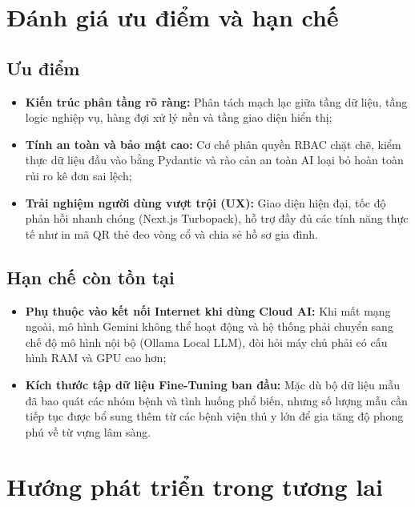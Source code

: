 \section{Đánh giá ưu điểm và hạn chế}
\label{sec:uunhuocdiem}

\subsection{Ưu điểm}
\begin{itemize}[leftmargin=1.5cm]
    \item \textbf{Kiến trúc phân tầng rõ ràng:} Phân tách mạch lạc giữa tầng dữ liệu, tầng logic nghiệp vụ, hàng đợi xử lý nền và tầng giao diện hiển thị;
    \item \textbf{Tính an toàn và bảo mật cao:} Cơ chế phân quyền RBAC chặt chẽ, kiểm thực dữ liệu đầu vào bằng Pydantic và rào cản an toàn AI loại bỏ hoàn toàn rủi ro kê đơn sai lệch;
    \item \textbf{Trải nghiệm người dùng vượt trội (UX):} Giao diện hiện đại, tốc độ phản hồi nhanh chóng (Next.js Turbopack), hỗ trợ đầy đủ các tính năng thực tế như in mã QR thẻ đeo vòng cổ và chia sẻ hồ sơ gia đình.
\end{itemize}

\subsection{Hạn chế còn tồn tại}
\begin{itemize}[leftmargin=1.5cm]
    \item \textbf{Phụ thuộc vào kết nối Internet khi dùng Cloud AI:} Khi mất mạng ngoài, mô hình Gemini không thể hoạt động và hệ thống phải chuyển sang chế độ mô hình nội bộ (Ollama Local LLM), đòi hỏi máy chủ phải có cấu hình RAM và GPU cao hơn;
    \item \textbf{Kích thước tập dữ liệu Fine-Tuning ban đầu:} Mặc dù bộ dữ liệu mẫu đã bao quát các nhóm bệnh và tình huống phổ biến, nhưng số lượng mẫu cần tiếp tục được bổ sung thêm từ các bệnh viện thú y lớn để gia tăng độ phong phú về từ vựng lâm sàng.
\end{itemize}

\section{Hướng phát triển trong tương lai}
\label{sec:huongphattrien}

